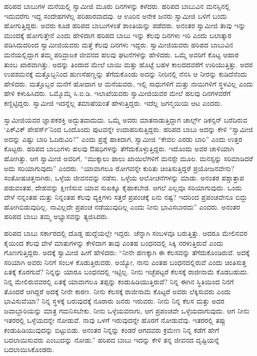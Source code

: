  ಹರಿಪದ ಬಾಬುಗಳ ಮನೆಯಲ್ಲಿ ಸ್ವಾಮೀಜಿ ಮೂರು ದಿನಗಳನ್ನು ಕಳೆದರು. ಹರಿಪದ ಬಾಬುವಿನ ಮನಸ್ಸಿನಲ್ಲಿ ಇದುವರೆಗು ಇದ್ದ ಸಂದೇಹಗಳೆಲ್ಲ ಪರಿಹಾರವಾದವು. ಆ ಊರಿನ ಅನೇಕ ಜನರು ಸ್ವಾಮೀಜಿ ಬಳಿಗೆ ಬಂದು ಹೋಗುತ್ತಿದ್ದರು. ಅವರು ಕೂಡ ಹರಿಪದ ಬಾಬುಗಳಂತೆ ಶಾಂತಿಯನ್ನು ಪಡೆದರು. ಅನಂತರ ಸ್ವಾಮೀಜಿ ತಾವು ಇನ್ನು ಮುಂದಕ್ಕೆ ಹೋಗುತ್ತೇನೆ ಎಂದು ಹೇಳಿದಾಗ ಹರಿಪದ ಬಾಬು ಇನ್ನು ಕೆಲವು ದಿನಗಳು ಇರಿ ಎಂದು ಬಲಾತ್ಕಾರ ಪಡಿಸಿದುದರಿಂದ ಸ್ವಾಮೀಜಿಯವರು ಮತ್ತೆ ಕೆಲವು ದಿನಗಳು ಇದ್ದರು. ಸ್ವಾಮೀಜಿಯವರು ಹರಿಪದ ಬಾಬುವಿನ ಮನೆಯಲ್ಲಿದ್ದಾಗ ತಮ್ಮ ಪರಿವ್ರಾಜಕ ಜೀವನದ ಹಲವು ಘಟನೆಗಳನ್ನು ಹೇಳಿದರು. ಒಮ್ಮೆ ಅವರಿಗೆ ಕೊಟ್ಟ ಆಹಾರ ತುಂಬ ಖಾರವಾಗಿತ್ತು. ಅದನ್ನು ತಿಂದಾದ ಮೇಲೆ ಬಾಯಿ ಮತ್ತು ಹೊಟ್ಟೆ ಬಹಳ ಕಾಲದದವರೆಗೆ ಉರಿಯುತ್ತಿತ್ತು. ಅದರ ಉಪಶಮನಕ್ಕೆ ಮತ್ತೊಬ್ಬನಿಂದ ಹುಣಸೆಹಣ್ಣನ್ನು ತೆಗೆದುಕೊಂಡು ಅದನ್ನು ನೀರಿನಲ್ಲಿ ನೆನಸಿ ಆ ನೀರನ್ನು ಕುಡಿದೆನೆಂದು ಹೇಳಿದರು. ಮತ್ತೊಬ್ಬರ ಮನೆಗೆ ಹೋದಾಗ ಆ ಮನೆಯವರು, ಇಲ್ಲಿ ಸಾಧುಗಳಿಗೆ ಮತ್ತು ನಾಯಿಗಳಿಗೆ ಸ್ಥಳವಿಲ್ಲ ಎಂದು ಹೇಳಿ ಕಳುಹಿಸಿದರು. ಒಮ್ಮೊಮ್ಮೆ ಸಿ.ಐ.ಡಿ. ಇಲಾಖೆಯವರು ಸ್ವಾಮೀಜಿಯವರ ಮೇಲೆ ಹಲವು ದಿನಗಳವರೆಗೆ ಕಣ್ಣಿಟ್ಟಿದ್ದರು. ಸ್ವಾಮೀಜಿ ಇದನ್ನೆಲ್ಲ ತಮಾಷೆಯಂತೆ ಹೇಳುತ್ತಿದ್ದರು. ಇದೆಲ್ಲ ಜಗನ್ಮಯಿಯ ಆಟ ಎಂದರು. 

 ಸ್ವಾಮೀಜಿಯವರ ಜ್ಞಾಪಕಶಕ್ತಿ ಅದ್ಭುತವಾದುದು. ಒಮ್ಮೆ ಅವರು ಮಾತನಾಡುತ್ತಿದ್ದಾಗ ಚಾರ್ಲ್ಸ್ ಡಿಕನ್ಸನ್ ಬರೆದಿರುವ ‘ಪಿಕ್‍ವಿಕ್ ಪೇಪರ್ಸ್’ನಿಂದ ಒಂದೊಂದು ಪುಟವನ್ನೇ ಉದಾಹರಿಸುತ್ತಿದ್ದರು. ಹರಿಪದ ಬಾಬು ಅದನ್ನು ಕೇಳಿ “ಸ್ವಾಮೀಜಿ ಅದನ್ನು ಎಷ್ಟು ಬಾರಿ ಓದಿರುವಿರಿ?” ಎಂದು ಪ್ರಶ್ನೆ ಹಾಕಿದಾಗ, ಸ್ವಾಮೀಜಿ “ಕೇವಲ ಎರಡು ಬಾರಿ” ಎಂದು ಉತ್ತರ ಕೊಟ್ಟರು. ಹರಿಪದ ಬಾಬುಗಳು ಹಲವು ಔಷಧಿಗಳನ್ನು ತೆಗೆದುಕೊಳ್ಳುತ್ತಿದ್ದರು. ಇದೊಂದು ಅವರ ಚಾಳಿಯಾಗಿ ಹೋಗಿತ್ತು. ಆಗ ಸ್ವಾಮೀಜಿ ಅವರಿಗೆ, “ಮುಕ್ಕಾಲು ಪಾಲು ಖಾಯಿಲೆಗಳಿಗೆ ಮನಸ್ಸೇ ಮೂಲ. ಮನಸ್ಸನ್ನು ಸರಿಮಾಡಿದರೆ ಅದು ಸರಿಯಾಗುವುದು” ಎಂದರು. “ಯಾವಾಗಲೂ ರೋಗವನ್ನೇ ಕುರಿತು ಚಿಂತಿಸುತ್ತಿದ್ದರೆ ಪ್ರಯೋಜನವೇನು? ಸಂತೋಷಚಿತ್ತನಾಗಿರು, ಒಳ್ಳೆಯ ಜೀವನವನ್ನು ನಡೆಸು. ಒಳ್ಳೆಯ ಆಲೋಚನೆಗಳನ್ನು ಮಾಡು. ಅನಂತರ ಪಶ್ಚಾತ್ತಾಪ ಪಡುವಂತಹ, ದೇಹವನ್ನು ಕ್ಷೀಣಿಸುವ ಯಾವ ಸುಖಕ್ಕೂ ಕೈಹಾಕಬೇಡ. ಆಗಲೆ ಎಲ್ಲವೂ ಸರಿಯಾಗುವುದು. ಒಂದು ವೇಳೆ ನನ್ನಂತಹ ಮತ್ತು ನಿನ್ನಂತಹ ಕೆಲವು ವ್ಯಕ್ತಿಗಳು ಸತ್ತರೆ ಪ್ರಪಂಚಕ್ಕೆ ಏನು ನಷ್ಟ? ಇದರಿಂದ ಪ್ರಪಂಚವೇನೂ ಬಿದ್ದು ಹೋಗಿಬಿಡುವುದಿಲ್ಲ. ನಾವಿಲ್ಲದೇ ಪ್ರಪಂಚ ನಡೆಯುವುದಿಲ್ಲ ಎಂದು ನೀನು ಭಾವಿಸಬಾರದು” ಎಂದರು. ಅನಂತರ ಹರಿಪದ ಬಾಬು ತಮ್ಮ ಅಭ್ಯಾಸವನ್ನು ತ್ಯಜಿಸಿದರು. 

 ಹರಿಪದ ಬಾಬು ಸರ್ಕಾರದಲ್ಲಿ ದೊಡ್ಡ ಹುದ್ದೆಯಲ್ಲೇ ಇದ್ದರು. ಚೆನ್ನಾಗಿ ಸಂಬಳವೂ ಬರುತ್ತಿತ್ತು. ಆದರೂ ಮೇಲಿನವರ ಕೈಯಿಂದ ಕೆಲವು ವೇಳೆ ಮಾತುಗಳನ್ನು ಕೇಳಿದಾಗ ತಾವು ಎಂತಹ ಬಂಧನದಲ್ಲಿ ಸಿಕ್ಕಿ ನರಳುತ್ತಿರುವೆ ಎಂದು ಗೊಣಗುತ್ತಿದ್ದರು. ಅದಕ್ಕೆ ಸ್ವಾಮೀಜಿ ಹೀಗೆ ಹೇಳಿದರು: “ನೀನೇ ಹಣಕ್ಕಾಗಿ ಈ ಕೆಲಸವನ್ನು ತೆಗೆದುಕೊಂಡಿರುವೆ. ಅದಕ್ಕೆ ಸರಿಯಾಗಿ ಅವರು ನಿನಗೆ ಸಂಬಳ ಕೊಡುತ್ತಿರುವರು. ಅಯ್ಯೋ, ನಾನು ಎಂತಹ ಬಂಧನದಲ್ಲಿರುವೆ ಎಂದು ಚಿಂತಿಸುತ್ತ ಏತಕ್ಕೆ ಕೊರಗುವೆ? ನಿನ್ನನ್ನು ಯಾರೂ ಬಂಧನದಲ್ಲಿ ಇಟ್ಟಿಲ್ಲ. ನೀನು ಇಚ್ಛೆಪಟ್ಟರೆ ಕೆಲಸಕ್ಕೆ ರಾಜೀನಾಮೆ ಕೊಡಬಹುದು. ನಿನ್ನ ಮೇಲಿರುವವರಲ್ಲಿ ಏತಕ್ಕೆ ಯಾವಾಗಲೂ ತಪ್ಪನ್ನು ಕಂಡುಹಿಡಿಯುತ್ತಿರುವೆ? ನಿನ್ನ ಈಗಿನ ಸ್ಥಿತಿಯಿಂದ ನಿನಗೆ ತೊಂದರೆ ಆಗಿದ್ದರೆ ಅದಕ್ಕೆ ನೀನೇ ಕಾರಣ. ನೀನು ಕೆಲಸಕ್ಕೆ ರಾಜೀನಾಮೆ ಕೊಟ್ಟರೆ ಅವರು ಲೆಕ್ಕಿಸುವರು ಎಂದು ಭಾವಿಸುವೆಯಾ? ನಿನ್ನ ಸ್ಥಳಕ್ಕೆ ಬರುವುದಕ್ಕೆ ನೂರಾರು ಜನರು ಇರುವರು. ನೀನು ನಿನ್ನ ಕೆಲಸ ಮತ್ತು ಅದರ ಜವಾಬ್ದಾರಿಯನ್ನು ಮಾತ್ರ ಗಮನಿಸಬೇಕು. ನೀನು ಒಳ್ಳೆಯವನಾಗು, ಆಗ ಪ್ರಪಂಚವೇ ಒಳ್ಳೆಯದಾಗುವುದು. ಆಗ ನೀನು ಇತರರಲ್ಲಿ ಒಳ್ಳೆಯದನ್ನೇ ನೋಡುವೆ. ನಾವು ಒಳಗೆ ಇರುವುದನ್ನೇ ಹೊರಗೆ ನೋಡುವೆವು. ಇತರರಲ್ಲಿ ತಪ್ಪು ಕಂಡುಹಿಡಿಯುವುದನ್ನು ಬಿಟ್ಟುಬಿಡು. ಅನಂತರ ನಿನ್ನನ್ನು ಕಂಡರೆ ಆಗದವರು ಕ್ರಮೇಣ ನಿನ್ನ ಕಡೆಗೆ ಹೇಗೆ ಬದಲಾಯಿಸುವರು ಎಂಬುದನ್ನು ನೋಡು.” ಹರಿಪದ ಬಾಬು ಇದನ್ನು ಕೇಳಿ ತನ್ನ ಜೀವನದ ದೃಷ್ಟಿಯನ್ನೆ ಬದಲಾಯಿಸಿಕೊಂಡರು. 

